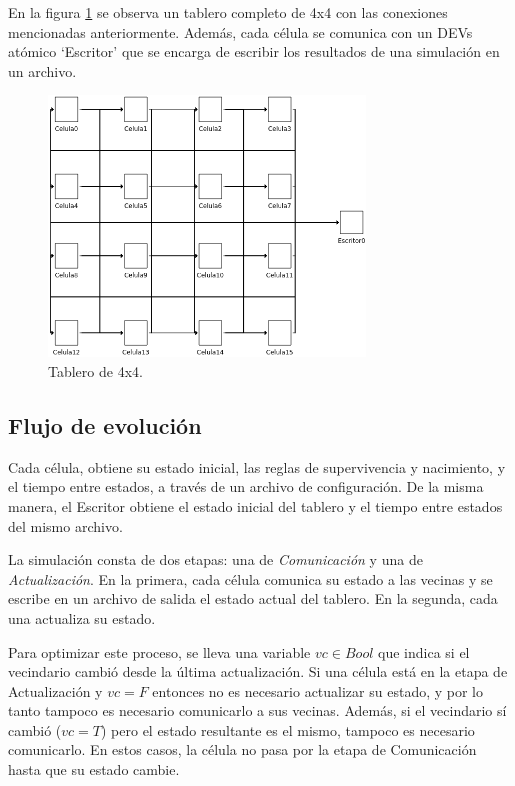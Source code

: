\documentclass[12pt]{article}
\begin{document}
En la figura \ref{img:tablero} se observa un tablero completo de 4x4 con las conexiones mencionadas anteriormente. Además, cada célula se comunica con un DEVs atómico `Escritor' que se encarga de escribir los resultados de una simulación en un archivo.

\begin{figure}[ht]
  \centering
  \includegraphics[width=0.75\textwidth]{imagenes/tablero.png}
  \caption{Tablero de 4x4.}
  \label{img:tablero}
\end{figure}


\subsection{Flujo de evolución}

Cada célula, obtiene su estado inicial, las reglas de supervivencia y nacimiento, y el tiempo entre estados, a través de un archivo de configuración. De la misma manera, el Escritor obtiene el estado inicial del tablero y el tiempo entre estados del mismo archivo.

La simulación consta de dos etapas: una de \textit{Comunicación} y una de \textit{Actualización}. En la primera, cada célula comunica su estado a las vecinas y se escribe en un archivo de salida el estado actual del tablero. En la segunda, cada una actualiza su estado.

Para optimizar este proceso, se lleva una variable $vc \in Bool$ que indica si el vecindario cambió desde la última actualización. Si una célula está en la etapa de Actualización y $vc = F$ entonces no es necesario actualizar su estado, y por lo tanto tampoco es necesario comunicarlo a sus vecinas. Además, si el vecindario sí cambió ($vc = T$) pero el estado resultante es el mismo, tampoco es necesario comunicarlo. En estos casos, la célula no pasa por la etapa de Comunicación hasta que su estado cambie.
\end{document}
